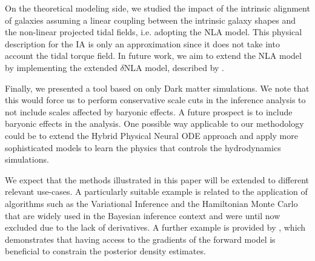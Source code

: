 \documentclass{aa}
\begin{document}
On the theoretical modeling side, we studied the impact of the intrinsic alignment of galaxies assuming a linear coupling between the intrinsic galaxy shapes and the non-linear projected tidal fields, i.e. adopting the NLA model. This physical description for the IA is only an approximation since it does not take into account the tidal torque field.
In future work, we aim to extend the NLA model by implementing the extended $\delta$NLA model, described by \cite{harnois2021cosmic}. 


Finally, we presented a tool based on only Dark matter simulations. We note that this would force us to perform conservative scale cuts in the inference analysis to not include scales affected by baryonic effects.
 A future prospect is to include baryonic effects in the analysis. One possible way applicable to our methodology  could be to extend the Hybrid Physical Neural ODE approach and apply more sophisticated models to learn the physics that controls the hydrodynamics simulations.



We expect that the methods illustrated in this paper will be extended to different relevant use-cases. A particularly suitable example is related to the application of algorithms such as the Variational Inference and the Hamiltonian Monte Carlo that are widely used in the Bayesian inference context and were until now excluded due to the lack of derivatives. 
A further example is provided by \cite{zeghal2022neural}, which demonstrates that having access to the gradients of the forward model is beneficial to constrain the posterior density estimates.
\end{document}
